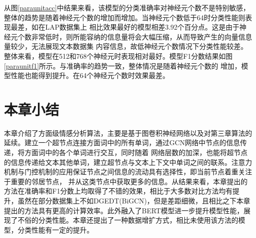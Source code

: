 
从图\ref{paraunitacc}中结果来看，该模型的分类准确率对神经元个数不是特别敏感，整体的趋势是随着神经元个数的增加而增加。当神经元个数低于64时分类性能则表现最差，如在LAP数据集上
相比效果最好的模型相差3.92个百分点。这是由于神经元个数非常低时，则所能容纳的信息量将会大幅压缩，从而导致产生的向量信息量较少，无法展现文本数据集
内容信息，故低神经元个数情况下分类性能较差。整体来看，模型在512和768个神经元时表现相对最好。模型F1分数结果如图\ref{paraunitf1}所示。与准确率的趋势一致，整体情况是随着神经元个数的
增加，模型性能也能得到提升。在64个神经元个数时效果最差。

\section{本章小结}
本章介绍了方面级情感分析算法，主要是基于图卷积神经网络以及对第三章算法的延续。建立一个超节点连接方面词中的所有单词，通过GCN网络中节点的信息传递，将方面词中的各个单词进行交互，同时随着
网络层数的加深，也能将超节点的信息传递给文本其他单词，建立超节点与文本上下文中单词之间的联系。注意力机制与门控机制的应用保证节点之间信息的流动具有选择性，即当前节点着重关注于重要的邻居节点，
并从这类节点中获取更多的信息。从结果来看，本章提出的方法在准确率和F1分数上均取得了不错的效果，相比于大多数对比方法均有提升，虽然在部分数据集上不如DGEDT(BiGCN)，但是差距细微，且相比之下本章
提出的方法具有更高的计算效率。此外融入了BERT模型进一步提升模型性能，展现了不俗的分类性能。本章还提出了一种数据增扩方式，相比未使用该方法的模型，分类性能有一定的提升。